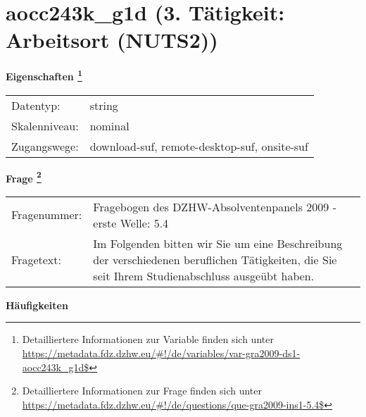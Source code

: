 
    \setcounter{footnote}{0}

    \vspace*{-1.8cm}
	\section{aocc243k\_g1d (3. Tätigkeit: Arbeitsort (NUTS2))}
	\label{section:aocc243k_g1d}



    \vspace*{0.5cm}
    \noindent\textbf{Eigenschaften
	\footnote{Detailliertere Informationen zur Variable finden sich unter
		\url{https://metadata.fdz.dzhw.eu/\#!/de/variables/var-gra2009-ds1-aocc243k_g1d$}}}\\
	\begin{tabularx}{\hsize}{@{}lX}
	Datentyp: & string \\
	Skalenniveau: & nominal \\
	Zugangswege: &
	  download-suf, 
	  remote-desktop-suf, 
	  onsite-suf
 \\
    \end{tabularx}



				\vspace*{0.5cm}
                \noindent\textbf{Frage
	                \footnote{Detailliertere Informationen zur Frage finden sich unter
		              \url{https://metadata.fdz.dzhw.eu/\#!/de/questions/que-gra2009-ins1-5.4$}}}\\
				\begin{tabularx}{\hsize}{@{}lX}
					Fragenummer: &
					  Fragebogen des DZHW-Absolventenpanels 2009 - erste Welle:
					  5.4
 \\
					Fragetext: & Im Folgenden bitten wir Sie um eine Beschreibung der verschiedenen beruflichen Tätigkeiten, die Sie seit Ihrem Studienabschluss ausgeübt haben. \\
				\end{tabularx}





        		\vspace*{0.5cm}
                \noindent\textbf{Häufigkeiten}

